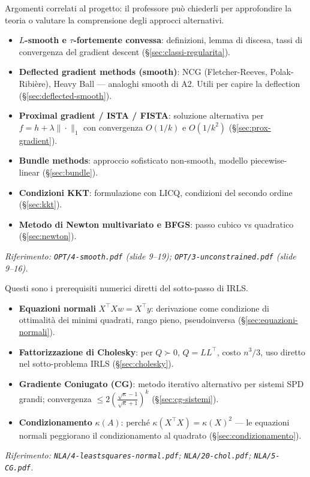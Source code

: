 \documentclass[11pt, a4paper, twoside]{book}
\theoremstyle{definition}
\theoremstyle{plain}
\theoremstyle{remark}
\begin{document}
\begin{tcolorbox}[enhanced, colback=orange!8, colframe=orange!60,
  title={\textbf{Livello 2 — Intorno Ottimizzazione (esame orale, approcci alternativi)}},
  fonttitle=\bfseries, breakable]
Argomenti correlati al progetto: il professore può chiederli per approfondire la teoria
o valutare la comprensione degli approcci alternativi.
\begin{itemize}
  \item \textbf{$L$-smooth e $\tau$-fortemente convessa}: definizioni, lemma di discesa, tassi di
        convergenza del gradient descent (\S\ref{sec:classi-regularita}).
  \item \textbf{Deflected gradient methods (smooth)}: NCG (Fletcher-Reeves, Polak-Ribière),
        Heavy Ball — analoghi smooth di A2. Utili per capire la deflection (\S\ref{sec:deflected-smooth}).
  \item \textbf{Proximal gradient / ISTA / FISTA}: soluzione alternativa per $f = h + \lambda\|\cdot\|_1$
        con convergenza $O(1/k)$ e $O(1/k^2)$ (\S\ref{sec:prox-gradient}).
  \item \textbf{Bundle methods}: approccio sofisticato non-smooth, modello piecewise-linear (\S\ref{sec:bundle}).
  \item \textbf{Condizioni KKT}: formulazione con LICQ, condizioni del secondo ordine (\S\ref{sec:kkt}).
  \item \textbf{Metodo di Newton multivariato e BFGS}: passo cubico vs quadratico (\S\ref{sec:newton}).
\end{itemize}
\textit{Riferimento: \texttt{OPT/4-smooth.pdf} (slide 9–19); \texttt{OPT/3-unconstrained.pdf} (slide 9–16).}
\end{tcolorbox}

\begin{tcolorbox}[enhanced, colback=NavyBlue!8, colframe=NavyBlue!60,
  title={\textbf{Livello 3 — Core NLA (critici per il progetto)}},
  fonttitle=\bfseries, breakable]
Questi sono i prerequisiti numerici diretti del sotto-passo di IRLS.
\begin{itemize}
  \item \textbf{Equazioni normali} $X^\top X w = X^\top y$: derivazione come condizione di ottimalità
        dei minimi quadrati, rango pieno, pseudoinversa (\S\ref{sec:equazioni-normali}).
  \item \textbf{Fattorizzazione di Cholesky}: per $Q \succ 0$, $Q = LL^\top$, costo $n^3/3$,
        uso diretto nel sotto-problema IRLS (\S\ref{sec:cholesky}).
  \item \textbf{Gradiente Coniugato (CG)}: metodo iterativo alternativo per sistemi SPD grandi;
        convergenza $\leq 2\left(\frac{\sqrt{\kappa}-1}{\sqrt{\kappa}+1}\right)^k$ (\S\ref{sec:cg-sistemi}).
  \item \textbf{Condizionamento} $\kappa(A)$: perché $\kappa(X^\top X) = \kappa(X)^2$ — le equazioni
        normali peggiorano il condizionamento al quadrato (\S\ref{sec:condizionamento}).
\end{itemize}
\textit{Riferimento: \texttt{NLA/4-leastsquares-normal.pdf}; \texttt{NLA/20-chol.pdf}; \texttt{NLA/5-CG.pdf}.}
\end{tcolorbox}
\end{document}
